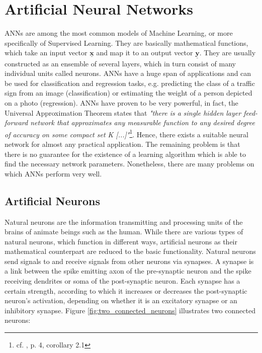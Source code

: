 \documentclass[11pt, a4paper]{article}
\newcommand\q[1]{\emph{"#1"}}
\newcommand\V[1]{\ensuremath{\underline{\mathbf{#1}}}}
\begin{document}
\newpage


\section{Artificial Neural Networks}
\label{sec:anns}

\acp{ANN} are among the most common models of Machine Learning, or more specifically of Supervised Learning. They are basically mathematical functions, which take an input vector \V{x} and map it to an output vector \V{y}. They are usually constructed as an ensemble of several layers, which in turn consist of many individual units called neurons. \acp{ANN} have a huge span of applications and can be used for classification and regression tasks, e.g. predicting the class of a traffic sign from an image (classification) or estimating the weight of a person depicted on a photo (regression). \acp{ANN} have proven to be very powerful, in fact, the Universal Approximation Theorem states that \q{there is a single hidden layer feed-forward network that approximates any measurable function to any desired degree of accuracy on some compact set K [...]}\footnote{cf. \cite{uat}, p. 4, corollary 2.1}. Hence, there exists a suitable neural network for almost any practical application. The remaining problem is that there is no guarantee for the existence of a learning algorithm which is able to find the necessary network parameters. Nonetheless, there are many problems on which \acp{ANN} perform very well.

\subsection{Artificial Neurons}

Natural neurons are the information transmitting and processing units of the brains of animate beings such as the human. While there are various types of natural neurons, which function in different ways, artificial neurons as their mathematical counterpart are reduced to the basic functionality. Natural neurons send signals to and receive signals from other neurons via synapses. A synapse is a link between the spike emitting axon of the pre-synaptic neuron and the spike receiving dendrites or soma of the post-synaptic neuron. Each synapse has a certain strength, according to which it increases or decreases the post-synaptic neuron's activation, depending on whether it is an excitatory synapse or an inhibitory synapse. Figure \ref{fig:two_connected_neurons} illustrates two connected neurons:
\end{document}
